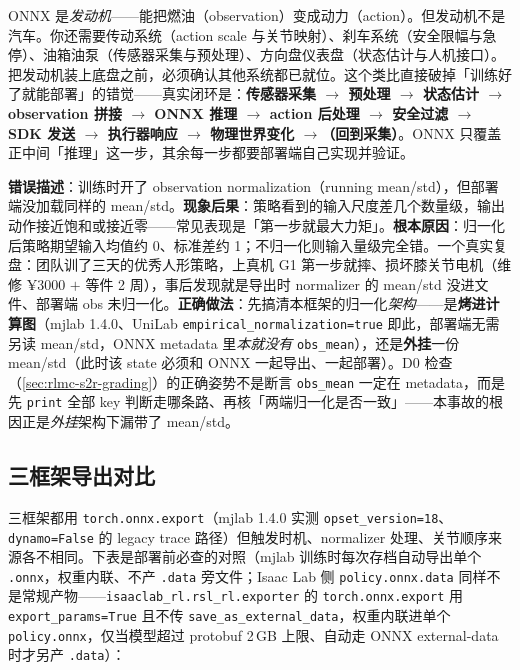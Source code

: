 \begin{insight}\label{ins:rlmc-s2r-engine}
ONNX 是\emph{发动机}——能把燃油（observation）变成动力（action）。但发动机不是汽车。你还需要传动系统（action scale 与关节映射）、刹车系统（安全限幅与急停）、油箱油泵（传感器采集与预处理）、方向盘仪表盘（状态估计与人机接口）。把发动机装上底盘之前，必须确认其他系统都已就位。这个类比直接破掉「训练好了就能部署」的错觉——真实闭环是：\textbf{传感器采集 $\to$ 预处理 $\to$ 状态估计 $\to$ observation 拼接 $\to$ ONNX 推理 $\to$ action 后处理 $\to$ 安全过滤 $\to$ SDK 发送 $\to$ 执行器响应 $\to$ 物理世界变化 $\to$（回到采集）}。ONNX 只覆盖正中间「推理」这一步，其余每一步都要部署端自己实现并验证。
\end{insight}

\begin{pitfall}
\textbf{错误描述}：训练时开了 observation normalization（running mean/std），但部署端没加载同样的 mean/std。\textbf{现象后果}：策略看到的输入尺度差几个数量级，输出动作接近饱和或接近零——常见表现是「第一步就最大力矩」。\textbf{根本原因}：归一化后策略期望输入均值约 0、标准差约 1；不归一化则输入量级完全错。一个真实复盘：团队训了三天的优秀人形策略，上真机 G1 第一步就摔、损坏膝关节电机（维修 ¥3000 $+$ 等件 2 周），事后发现就是导出时 normalizer 的 mean/std 没进文件、部署端 obs 未归一化。\textbf{正确做法}：先搞清本框架的归一化\emph{架构}——是\textbf{烤进计算图}（mjlab 1.4.0、UniLab \verb|empirical_normalization=true| 即此，部署端无需另读 mean/std，ONNX metadata 里\emph{本就没有} \verb|obs_mean|），还是\textbf{外挂}一份 mean/std（此时该 state 必须和 ONNX 一起导出、一起部署）。D0 检查（\cref{sec:rlmc-s2r-grading}）的正确姿势不是断言 \verb|obs_mean| 一定在 metadata，而是先 \verb|print| 全部 key 判断走哪条路、再核「两端归一化是否一致」——本事故的根因正是\emph{外挂}架构下漏带了 mean/std。
\end{pitfall}

\subsection{三框架导出对比}
\label{sec:rlmc-s2r-onnx-frameworks}

三框架都用 \verb|torch.onnx.export|（mjlab 1.4.0 实测 \verb|opset_version=18|、\verb|dynamo=False| 的 legacy trace 路径）但触发时机、normalizer 处理、关节顺序来源各不相同。下表是部署前必查的对照（mjlab 训练时每次存档自动导出单个 \verb|.onnx|，权重内联、不产 \verb|.data| 旁文件；Isaac Lab 侧 \texttt{policy.onnx.data} 同样不是常规产物——\texttt{isaaclab\_rl.rsl\_rl.exporter} 的 \verb|torch.onnx.export| 用 \verb|export_params=True| 且不传 \verb|save_as_external_data|，权重内联进单个 \texttt{policy.onnx}，仅当模型超过 protobuf 2\,GB 上限、自动走 ONNX external-data 时才另产 \texttt{.data}）：

